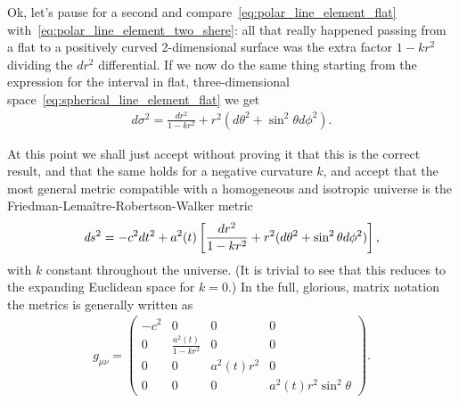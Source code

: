 Ok, let's pause for a second and compare~\eqref{eq:polar_line_element_flat}
with~\eqref{eq:polar_line_element_two_shere}: all that really happened passing from
a flat to a positively curved 2-dimensional surface was the extra factor $1 - kr^2$
dividing the $dr^2$ differential. If we now do the same thing starting from the
expression for the interval in flat, three-dimensional space~\eqref{eq:spherical_line_element_flat}
we get
\begin{align*}
  d\sigma^2 =  \frac{dr^2}{1 - kr^2} + r^2 (d\theta^2 + \sin^2\theta d\phi^2).
\end{align*}

At this point we shall just accept without proving it that this is the correct result,
and that the same holds for a negative curvature $k$, and accept that the most general
metric compatible with a homogeneous and isotropic universe is the
Friedman-Lema\^itre-Robertson-Walker metric
\begin{align}\label{eq:flrw_metric}
  \emph{d}s^2 = -c^2 dt^2 + a^2(t) \left[ \frac{dr^2}{1 - kr^2} +
  r^2 (d\theta^2 + \sin^2\theta d\phi^2)\right],
\end{align}
with $k$ constant throughout the universe. (It is trivial to see that this reduces
to the expanding Euclidean space for $k =0$.) In the full, glorious, matrix notation
the metrics is generally written as
\begin{align}
  g_{\mu\nu} =
  \begin{pmatrix}
    -c^2 & 0 & 0 & 0\\
    0 & \frac{a^2(t)}{1 - kr^2} & 0 & 0\\
    0 & 0 & a^2(t) r^2 & 0\\
    0 & 0 & 0 & a^2(t) r^2 \sin^2\theta
  \end{pmatrix}.
\end{align}

